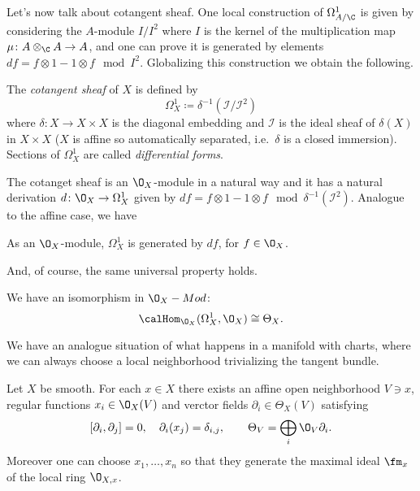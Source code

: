 \documentclass[a4paper, 10pt]{article}
\begin{document}
        Let's now talk about cotangent sheaf. One local construction of $\Omega_{A/\C}^1$ is given by considering the $A$-module $I/I^2$ where $I$ is the kernel of the multiplication map $\mu\colon A \otimes_{\C} A \to A$, and one can prove it is generated by elements $df = f \otimes 1 - 1 \otimes f \mod I^2$.
        Globalizing this construction we obtain the following.
        \begin{defn}
            The \emph{cotangent sheaf} of $X$ is defined by \[\Omega^1_X \coloneqq \delta^{-1}(\mathcal{I}/\mathcal{I}^2) \] where $\delta\colon X \to X \times X$ is the diagonal embedding and $\mathcal{I}$ is the ideal sheaf of $\delta(X)$ in $X \times X$ ($X$ is affine so automatically separated, i.e.\ $\delta$ is a closed immersion). 
            Sections of $\Omega^1_X$ are called \emph{differential forms}.
        \end{defn}
        The cotanget sheaf is an $\O_X$-module in a natural way and it has a natural derivation $d\colon \O_X \to \Omega^1_X$ given by $df = f \otimes 1 - 1 \otimes f \mod \delta^{-1}(\mathcal{I}^2)$.
        Analogue to the affine case, we have 
        \begin{lemma}
            As an $\O_X$-module, $\Omega_X^1$ is generated by $df$, for $f \in \O_X$. 
        \end{lemma}
        And, of course, the same universal property holds.
        \begin{prop}
            We have an isomorphism in $\O_X-Mod$: \[\calHom_{\O_X}(\Omega^1_X, \O_X) \cong \Theta_X. \]
        \end{prop}
        We have an analogue situation of what happens in a manifold with charts, where we can always choose a local neighborhood trivializing the tangent bundle.
        \begin{thm}
            Let $X$ be smooth. For each $x \in X$ there exists an affine open neighborhood $V \ni x$, regular functions $x_i \in \O_X(V)$ and verctor fields $\partial_i \in \Theta_X(V)$ satisfying \[[\partial_i, \partial_j] = 0, \quad \partial_i(x_j) = \delta_{i,j}, \qquad \Theta_V = \bigoplus_i \O_V\partial_i. \] Moreover one can choose $x_1, \dots, x_n$ so that they generate the maximal ideal $\fm_x$ of the local ring $\O_{X,x}$.
        \end{thm}
\end{document}
